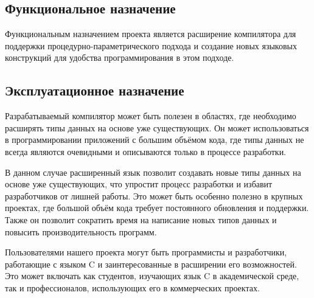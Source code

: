 \subsection{Функциональное назначение}

Функциональным назначением проекта является расширение компилятора для поддержки процедурно-параметрического подхода и создание новых языковых конструкций для удобства программирования в этом подходе.





\subsection{Эксплуатационное назначение}

Разрабатываемый компилятор может быть полезен в областях, где необходимо расширять типы данных на основе уже существующих. Он может использоваться в программировании приложений с большим объёмом кода, где типы данных не всегда являются очевидными и описываются только в процессе разработки.

В данном случае расширенный язык позволит создавать новые типы данных на основе уже существующих, что упростит процесс разработки и избавит разработчиков от лишней работы. Это может быть особенно полезно в крупных проектах, где большой объём кода требует постоянного обновления и поддержки. Также он позволит сократить время на написание новых типов данных и повысить производительность программ.

Пользователями нашего проекта могут быть программисты и разработчики, работающие с языком C и заинтересованные в расширении его возможностей. Это может включать как студентов, изучающих язык C в академической среде, так и профессионалов, использующих его в коммерческих проектах.
